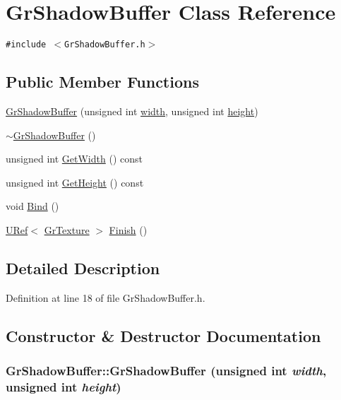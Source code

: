 \hypertarget{class_gr_shadow_buffer}{
\section{GrShadowBuffer Class Reference}
\label{class_gr_shadow_buffer}
}
{\tt \#include $<$GrShadowBuffer.h$>$}

\subsection*{Public Member Functions}
\begin{CompactItemize}
\item 
\hyperlink{class_gr_shadow_buffer_00945d61630372cd9e47951c07aeeef5}{GrShadowBuffer} (unsigned int \hyperlink{wglext_8h_e6531b1788ca42a9ae8155b0c52e7630}{width}, unsigned int \hyperlink{wglext_8h_b2e63df950c3789599e1e43f477bc9e3}{height})
\item 
\hyperlink{class_gr_shadow_buffer_21c7a7e89872ff5d1f3d475d4259c370}{$\sim$GrShadowBuffer} ()
\item 
unsigned int \hyperlink{class_gr_shadow_buffer_48b42cb4ab666f7b920a4bed33ce1a2d}{GetWidth} () const 
\item 
unsigned int \hyperlink{class_gr_shadow_buffer_09532b8365c6f1ac03811306fddccba5}{GetHeight} () const 
\item 
void \hyperlink{class_gr_shadow_buffer_ac80386a135c833c980497559936e98f}{Bind} ()
\item 
\hyperlink{class_u_ref}{URef}$<$ \hyperlink{class_gr_texture}{GrTexture} $>$ \hyperlink{class_gr_shadow_buffer_248dc6ca6068c376661cb45a02205e89}{Finish} ()
\end{CompactItemize}


\subsection{Detailed Description}


Definition at line 18 of file GrShadowBuffer.h.

\subsection{Constructor \& Destructor Documentation}
\hypertarget{class_gr_shadow_buffer_00945d61630372cd9e47951c07aeeef5}{
\subsubsection[{GrShadowBuffer}]{\setlength{\rightskip}{0pt plus 5cm}GrShadowBuffer::GrShadowBuffer (unsigned int {\em width}, \/  unsigned int {\em height})}}
\label{class_gr_shadow_buffer_00945d61630372cd9e47951c07aeeef5}




